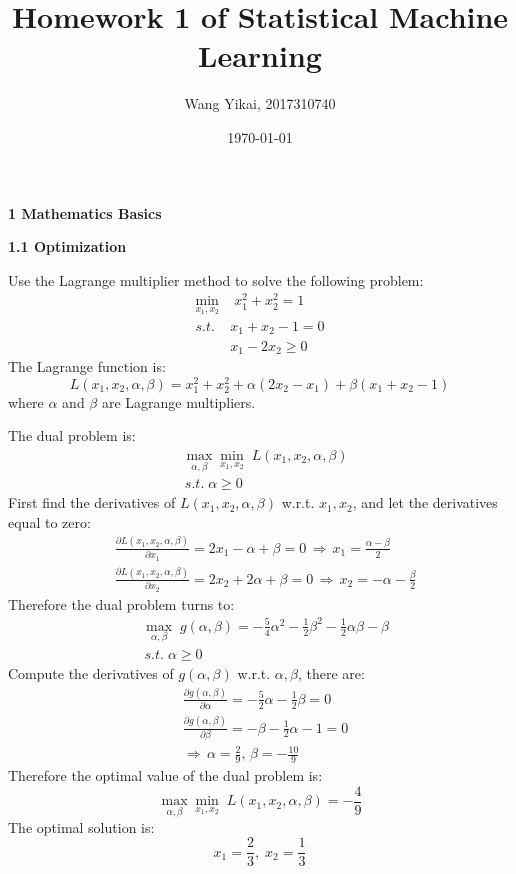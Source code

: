 \documentclass[12pt]{article}
\title{Homework 1 of Statistical Machine Learning}
\author{Wang Yikai, 2017310740}
\date{\today}
\begin{document}
\maketitle

{\Large \bf 1 Mathematics Basics}
\par
\bigskip
{\large \bf 1.1 Optimization}
\par
Use the Lagrange multiplier method to solve the following problem:
\begin{align*}
\min_{x_1,x_2}&\;x_1^2+x_2^2=1\\
s.t.\;&x_1+x_2-1=0\\
&x_1-2x_2\geq0
\end{align*}
The Lagrange function is:
$$L(x_1,x_2,\alpha,\beta)=x_1^2+x_2^2+\alpha(2x_2-x_1)+\beta(x_1+x_2-1)$$
where $\alpha$ and $\beta$ are Lagrange multipliers.
\par
The dual problem is:
\begin{align*}
&\max_{\alpha,\beta}\min_{x_1,x_2}\;L(x_1,x_2,\alpha,\beta)\\
&\,s.t.\;\alpha\geq0
\end{align*}
First find the derivatives of $L(x_1,x_2,\alpha,\beta)$ w.r.t. $x_1,x_2$, and let the derivatives equal to zero:
\begin{align*}
&\frac{\partial L(x_1,x_2,\alpha,\beta)}{\partial x_1}=2x_1-\alpha+\beta=0\,\Rightarrow\,x_1=\frac{\alpha-\beta}{2}\\
&\frac{\partial L(x_1,x_2,\alpha,\beta)}{\partial x_2}=2x_2+2\alpha+\beta=0\,\Rightarrow\,x_2=-\alpha-\frac{\beta}{2}
\end{align*}
Therefore the dual problem turns to:
\begin{align*}
&\max_{\alpha,\beta}\;g(\alpha,\beta)=-\frac{5}{4}\alpha^2-\frac{1}{2}\beta^2-\frac{1}{2}\alpha\beta-\beta\\
&\,s.t.\;\alpha\geq0
\end{align*}
Compute the derivatives of $g(\alpha,\beta)$ w.r.t. $\alpha,\beta$, there are:
\begin{align*}
&\frac{\partial g(\alpha,\beta)}{\partial \alpha}=-\frac{5}{2}\alpha-\frac{1}{2}\beta=0\\
&\frac{\partial g(\alpha,\beta)}{\partial \beta}=-\beta-\frac{1}{2}\alpha-1=0\\
&\Rightarrow\, \alpha=\frac{2}{9},\,\beta=-\frac{10}{9}
\end{align*}
Therefore the optimal value of the dual problem is:
$$\max_{\alpha,\beta}\min_{x_1,x_2}\;L(x_1,x_2,\alpha,\beta)=-\frac{4}{9}$$
The optimal solution is:
$$x_1=\frac{2}{3},\;x_2=\frac{1}{3}$$
\end{document}
